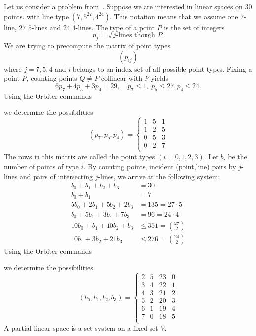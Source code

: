 \bigskip

Let us consider a problem from~\cite{BettenBetten10}.
Suppose we are interested in linear spaces on 30 points.
with line type $(7,5^{27},4^{24})$. 
This notation means that we assume 
one $7$-line, $27$ $5$-lines and $24$ $4$-lines. 
The type of a point $P$ is the set of integers 
$$
p_{j} = \# j\mbox{-lines though $P$}.
$$
We are trying to precompute the matrix of point types  
$$
(p_{ij})
$$
where $j=7,5,4$ and $i$ belongs to an index set of all possible point types.
Fixing a point $P$, counting points $Q \neq P$ collinear with $P$ yields
$$
6p_7 + 4p_5+3p_4 = 29, \quad p_7 \le 1, \; p_5 \le 27, p_4 \le 24.
$$
Using the Orbiter commands 
{\tt

}
we determine the possibilities 
$$
(p_7,p_5,p_4) = \left\{
\begin{array}{ccc}
1 & 5 & 1 \\
1 & 2 & 5 \\
0 & 5 & 3 \\
0 & 2 & 7 \\
\end{array}
\right.
$$
The rows in this matrix are called the point types $(i=0,1,2,3).$
Let $b_i$ be the number of points of type  $i.$
By counting points, incident (point,line) pairs by $j$-lines 
and pairs of intersecting $j$-lines, we arrive at the following system:
\begin{align*}
	b_0 + b_1 + b_2 + b_3 & = 30 \\
	b_0 + b_1 & = 7\\
	5b_0 + 2b_1 + 5b_2 + 2b_3 &= 135 = 27 \cdot 5\\
	b_0 + 5b_1+3b_2+7b_3 & = 96 = 24 \cdot 4\\
	10b_0 + b_1 + 10b_2 + b_3 & \le 351 = {27 \choose 2}\\
	10b_1+3b_2+21b_3 & \le 276 = {24 \choose 2}
\end{align*}
Using the Orbiter commands 
{\tt

}
we determine the possibilities 
$$
(b_0,b_1,b_2,b_3) = \left\{
\begin{array}{cccc}
2 &5 &23 &0 \\
3 &4 &22 &1 \\
4 &3 &21 &2 \\
5 &2 &20 &3 \\
6 &1 &19 &4 \\
7 &0 &18 &5 \\
\end{array}
\right.
$$
A partial linear space is a set system on a fixed set $V$. 
